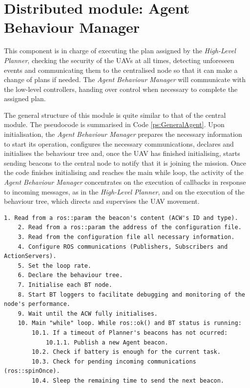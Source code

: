 \documentclass[fontsize=11pt, English=false, Español=true, Myfinal=true, twoside, numbers=noenddot]{scrbook}
\begin{document}
{\section{Distributed module: Agent Behaviour Manager}
\label{sec:Distributed module: behaviour manager}
This component is in charge of executing the plan assigned by the \emph{High-Level Planner}, checking the security of the \glspl{UAV} at all times, detecting unforeseen events and communicating them to the centralised node so that it can make a change of plans if needed. The \emph{Agent Behaviour Manager} will communicate with the low-level controllers, handing over control when necessary to complete the assigned plan.

The general structure of this module is quite similar to that of the central module. The pseudocode is summarised in Code \ref{ps:GeneralAgent}. Upon initialisation, the \emph{Agent Behaviour Manager} prepares the necessary information to start its operation, configures the necessary communications, declares and initialises the behaviour tree and, once the \gls{UAV} has finished initialising, starts sending beacons to the central node to notify that it is joining the mission. Once the code finishes initialising and reaches the main while loop, the activity of the \emph{Agent Behaviour Manager} concentrates on the execution of callbacks in response to incoming messages, as in the \emph{High-Level Planner}, and on the execution of the behaviour tree, which directs and supervises the \gls{UAV} movement.

\begin{lstlisting}[caption={General operation of \emph{Agent Behaviour Manager}}, breaklines=true, label=ps:GeneralAgent]
	1. Read from a ros::param the beacon's content (ACW's ID and type).
	2. Read from a ros::param the address of the configuration file.
	3. Read from the configuration file all necessary information.
	4. Configure ROS communications (Publishers, Subscribers and ActionServers).
	5. Set the loop rate.
	6. Declare the behaviour tree.
	7. Initialise each BT node.
	8. Start BT loggers to facilitate debugging and monitoring of the node's performance.
	9. Wait until the ACW fully initialises.
	10. Main "while" loop. While ros::ok() and BT status is running:
		10.1. If a timeout of Planner's beacons has not ocurred:
			10.1.1. Publish a new Agent beacon.
		10.2. Check if battery is enough for the current task.
		10.3. Check for pending incoming communications (ros::spinOnce).
		10.4. Sleep the remaining time to send the next beacon.
\end{lstlisting}

}
\end{document}
